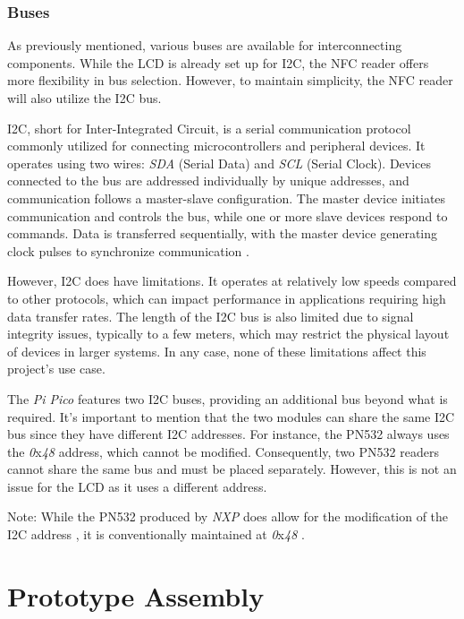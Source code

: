\subsubsection*{Buses}

As previously mentioned, various buses are available for interconnecting components. While the LCD is already set up 
for I2C, the NFC reader offers more flexibility in bus selection. However, to maintain simplicity, the NFC reader will 
also utilize the I2C bus.

I2C, short for Inter-Integrated Circuit, is a serial communication protocol commonly utilized for connecting 
microcontrollers and peripheral devices. It operates using two wires: \textit{SDA} (Serial Data) and \textit{SCL} (Serial 
Clock). Devices connected to the bus are addressed individually by unique addresses, and communication follows a 
master-slave configuration. The master device initiates communication and controls the bus, while one or more slave devices 
respond to commands. Data is transferred sequentially, with the master device generating clock pulses to synchronize 
communication \cite{nxpi2c}.

However, I2C does have limitations. It operates at relatively low speeds compared to other protocols, which can impact 
performance in applications requiring high data transfer rates. The length of the I2C bus is also limited due to signal 
integrity issues, typically to a few meters, which may restrict the physical layout of devices in larger systems. In any 
case, none of these limitations affect this project's use case.

The \textit{Pi Pico} features two I2C buses, providing an additional bus beyond what is required. It's important to mention 
that the two modules can share the same I2C bus since they have different I2C addresses. For instance, the PN532 always uses 
the \textit{0}x\textit{48} address, which cannot be modified. Consequently, two PN532 readers cannot share the same bus and 
must be placed separately. However, this is not an issue for the LCD as it uses a different address.

Note: While the PN532 produced by \textit{NXP} does allow for the modification of the I2C address \cite{nxp_pn532}, it is 
conventionally maintained at \textit{0}x\textit{48} \cite{i2cdevices_pn532}.

%
%

\section{Prototype Assembly}

